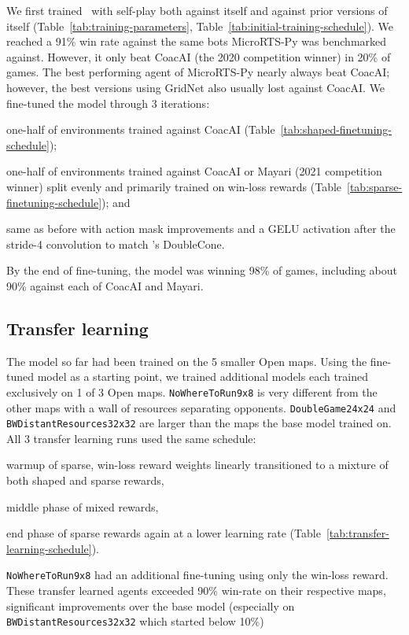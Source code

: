 \documentclass{article}
\begin{document}
We first trained \agentName\ with self-play both against itself and against prior
versions of itself (Table~\ref{tab:training-parameters},
Table~\ref{tab:initial-training-schedule}). We reached a 91\% win rate against the same bots MicroRTS-Py was
benchmarked against. However, it only beat CoacAI (the 2020 competition winner) in 20\%
of games. The best performing agent of MicroRTS-Py nearly always beat CoacAI; however,
the best versions using GridNet also usually lost against CoacAI. We fine-tuned
the model through 3 iterations:
\begin{inparaenum}[(1)]
    \item one-half of environments trained against CoacAI (Table~\ref{tab:shaped-finetuning-schedule});
    \item one-half of environments trained against CoacAI or Mayari (2021 competition
    winner) split evenly and primarily trained on win-loss rewards (Table~\ref{tab:sparse-finetuning-schedule}); and
    \item same as before with action mask improvements and a GELU activation
    after the stride-4 convolution to match \citet{Ferdinand2021doublecone}'s DoubleCone.
\end{inparaenum}
By the end of fine-tuning, the model was winning 98\% of games, including about 90\%
against each of CoacAI and Mayari.

\subsection{Transfer learning}
The model so far had been trained on the 5 smaller Open maps. Using the
fine-tuned model as a starting point, we trained additional models each trained exclusively
on 1 of 3 Open maps. \texttt{NoWhereToRun9x8} is very different from the other maps with a wall of
resources separating opponents. \texttt{DoubleGame24x24} and
\texttt{BWDistantResources32x32} are larger than the maps the base model trained on.
All 3 transfer learning runs used the same schedule:
\begin{inparaenum}[(1)]
    \item warmup of sparse, win-loss reward weights linearly transitioned to a mixture
    of both shaped and sparse rewards,
    \item middle phase of mixed rewards,
    \item end phase of sparse rewards again at a lower learning rate (Table~\ref{tab:transfer-learning-schedule}).
\end{inparaenum}
\texttt{NoWhereToRun9x8} had an additional fine-tuning using only the win-loss reward.
These transfer learned agents exceeded 90\% win-rate on their respective maps,
significant improvements over the base model (especially on
\texttt{BWDistantResources32x32} which started below 10\%)
\end{document}
